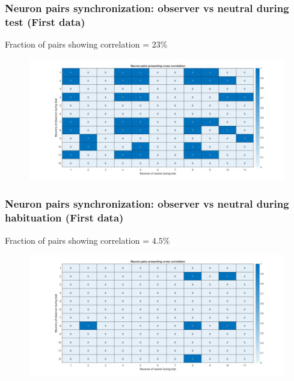 \documentclass{beamer}
\begin{document}
\begin{frame}
\frametitle{Neuron pairs synchronization: observer vs neutral during test (First data)}


Fraction of pairs showing correlation = $23\%$


\begin{figure}[H]
\begin{center}
	\hspace*{-1cm}
	\includegraphics[scale=.30]{cc_active3.jpg} 
\end{center}  


\end{figure}


\end{frame}







\begin{frame}
\frametitle{Neuron pairs synchronization: observer vs neutral during habituation (First data)}


Fraction of pairs showing correlation = $4.5 \%$


\begin{figure}[H]
\begin{center}
	\hspace*{-1cm}
	\includegraphics[scale=.30]{cc_active4.jpg} 
\end{center}  


\end{figure}


\end{frame}
\end{document}
